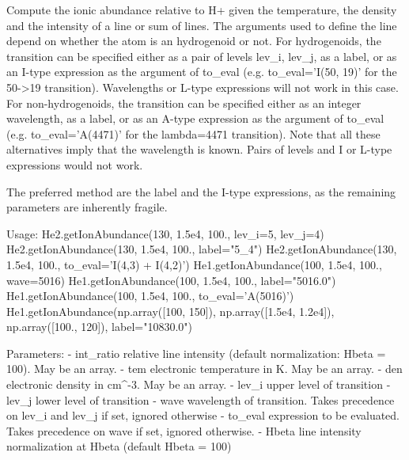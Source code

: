 \begin{DoxyVerb}Compute the ionic abundance relative to H+ given the temperature, the density and the 
    intensity of a line or sum of lines.
The arguments used to define the line depend on whether the atom is an hydrogenoid or not. 
For hydrogenoids, the transition can be specified either as a pair of levels 
    lev_i, lev_j, as a label, or as an I-type expression as the argument of to_eval 
    (e.g. to_eval='I(50, 19)' for the 50->19 transition). Wavelengths or L-type expressions 
    will not work in this case. 
For non-hydrogenoids, the transition can be specified either as an integer wavelength, 
    as a label, or as an A-type expression as the argument of to_eval (e.g. to_eval='A(4471)' 
    for the lambda=4471 transition). Note that all these alternatives imply that the wavelength
    is known. Pairs of levels and I or L-type expressions would not work.

The preferred method are the label and the I-type expressions, as the remaining parameters 
    are inherently fragile.

Usage:
    He2.getIonAbundance(130, 1.5e4, 100., lev_i=5, lev_j=4)
    He2.getIonAbundance(130, 1.5e4, 100., label="5_4")
    He2.getIonAbundance(130, 1.5e4, 100., to_eval='I(4,3) + I(4,2)')
    He1.getIonAbundance(100, 1.5e4, 100., wave=5016)
    He1.getIonAbundance(100, 1.5e4, 100., label="5016.0")
    He1.getIonAbundance(100, 1.5e4, 100., to_eval='A(5016)')
    He1.getIonAbundance(np.array([100, 150]), np.array([1.5e4, 1.2e4]), np.array([100., 120]), 
label="10830.0")
    
Parameters:
    - int_ratio    relative line intensity (default normalization: Hbeta = 100). 
            May be an array.
    - tem          electronic temperature in K. May be an array.
    - den          electronic density in cm^-3. May be an array.
    - lev_i        upper level of transition
    - lev_j        lower level of transition
    - wave         wavelength of transition. Takes precedence on lev_i and lev_j if set, 
            ignored otherwise 
    - to_eval      expression to be evaluated. Takes precedence on wave if set, 
            ignored otherwise.
    - Hbeta        line intensity normalization at Hbeta (default Hbeta = 100)\end{DoxyVerb}
 \hypertarget{classpyneb_1_1core_1_1pynebcore_1_1_rec_atom_a59deba69fded8f0f17b40c917df3a09c}{}
